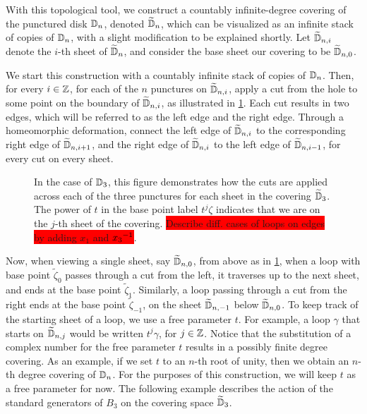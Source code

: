 With this topological tool, we construct a countably infinite-degree covering of the punctured disk $\mathbb{D}_n$, denoted $\widetilde{\mathbb{D}}_n$, which can be visualized as an infinite stack of copies of $\mathbb{D}_n$, with a slight modification to be explained shortly. Let $\widetilde{\mathbb{D}}_{n,i}$ denote the $i$-th sheet of $\widetilde{\mathbb{D}}_n$, and consider the base sheet our covering to be $\widetilde{\mathbb{D}}_{n,0}$.

We start this construction with a countably infinite stack of copies of $\mathbb{D}_n$. Then, for every $i\in\mathbb{Z}$, for each of the $n$ punctures on $\widetilde{\mathbb{D}}_{n,i}$, apply a cut from the hole to some point on the boundary of $\widetilde{\mathbb{D}}_{n,i}$, as illustrated in \cref{fig:D3_cuts}. Each cut results in two edges, which will be referred to as the left edge and the right edge. Through a homeomorphic deformation, connect the left edge of $\widetilde{\mathbb{D}}_{n,i}$ to the corresponding right edge of $\widetilde{\mathbb{D}}_{n,i+1}$, and the right edge of $\widetilde{\mathbb{D}}_{n,i}$ to the left edge of $\widetilde{\mathbb{D}}_{n,i-1}$, for every cut on every sheet.

\begin{figure}[htbp]
    \centering
    
    \caption{In the case of $\mathbb{D}_3$, this figure demonstrates how the cuts are applied across each of the three punctures for each sheet in the covering $\widetilde{\mathbb{D}}_3$. The power of $t$ in the base point label $t^j\zeta$ indicates that we are on the $j$-th sheet of the covering. \colorbox{red}{Describe diff. cases of loops on edges by adding $x_1$ and ${ x_3 }^{-1}$}.}\label{fig:D3_cuts}
\end{figure}

Now, when viewing a single sheet, say $\widetilde{\mathbb{D}}_{n,0}$, from above as in \cref{fig:D3_cuts}, when a loop with base point $\tilde{\zeta}_0$ passes through a cut from the left, it traverses up to the next sheet, and ends at the base point $\tilde{\zeta}_1$. Similarly, a loop passing through a cut from the right ends at the base point $\tilde{\zeta}_{-1}$, on the sheet $\widetilde{\mathbb{D}}_{n,-1}$ below $\widetilde{\mathbb{D}}_{n,0}$. To keep track of the starting sheet of a loop, we use a free parameter $t$. For example, a loop $\gamma$ that starts on $\widetilde{\mathbb{D}}_{n,j}$ would be written $t^j \gamma$, for $j\in\mathbb{Z}$. Notice that the substitution of a complex number for the free parameter $t$ results in a possibly finite degree covering. As an example, if we set $t$ to an $n$-th root of unity, then we obtain an $n$-th degree covering of $\mathbb{D}_n$. For the purposes of this construction, we will keep $t$ as a free parameter for now. The following example describes the action of the standard generators of $B_3$ on the covering space $\widetilde{\mathbb{D}}_3$.

